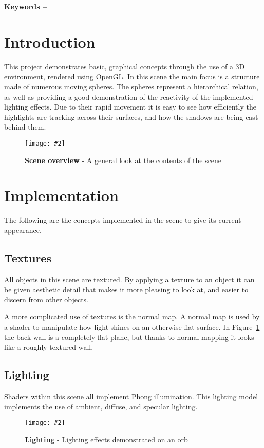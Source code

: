 \documentclass[10pt, a4paper]{article}
\title{\mytitle}
\author{\myauthor\hspace{1em}\\\contact\\Edinburgh Napier University\hspace{0.5em}-\hspace{0.5em}\mymodule}
\date{}
\newcommand{\figuremacro}[5]{
    \begin{figure}[#1]
        \centering
        \texttt{[image: \#2]}
        \caption[#3]{\textbf{#3}#4}
        \label{fig:#2}
    \end{figure}
}
\begin{document}
	\maketitle
	\begin{abstract}
		This is a project which demonstrates the implementation of basic lighting, shadowing, and texturing effects, in a 3D graphical scene.
	\end{abstract}
    
	\textbf{Keywords -- }{\mykeywords}
	\section{Introduction}
	This project demonstrates basic, graphical concepts through the use of a 3D environment, rendered using OpenGL.  In this scene the main focus is a structure made of numerous moving spheres.  The spheres represent a hierarchical relation, as well as providing a good demonstration of the reactivity of the implemented lighting effects.  Due to their rapid movement it is easy to see how efficiently the highlights are tracking across their surfaces, and how the shadows are being cast behind them.
    
    \figuremacro{h}{basic_scene}{Scene overview}{ - A general look at the contents of the scene}{1.0}
	
	\section{Implementation}
	The following are the concepts implemented in the scene to give its current appearance.
	\subsection{Textures}
	All objects in this scene are textured.  By applying a texture to an object it can be given aesthetic detail that makes it more pleasing to look at, and easier to discern from other objects.
	
	A more complicated use of textures is the normal map.  A normal map is used by a shader to manipulate how light shines on an otherwise flat surface.  In Figure~\ref{fig:basic_scene} the back wall is a completely flat plane, but thanks to normal mapping it looks like a roughly textured wall.
	\subsection{Lighting}
	Shaders within this scene all implement Phong illumination.  This lighting model implements the use of ambient, diffuse, and specular lighting.
	\figuremacro{h}{Phong_demo}{Lighting}{ - Lighting effects demonstrated on an orb}{1.0}
	
\end{document}

